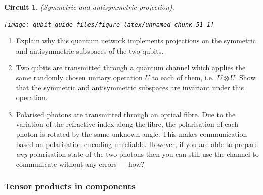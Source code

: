 \documentclass[fleqn,a4paper]{article}
\newtheorem*{circuit}{Circuit}
\theoremstyle{definition}
\theoremstyle{definition}
\theoremstyle{definition}
\theoremstyle{definition}
\theoremstyle{remark}
\begin{document}
\begin{circuit}

\emph{(Symmetric and antisymmetric projection).}

\begin{center}\texttt{[image: qubit\_guide\_files/figure-latex/unnamed-chunk-51-1]} \end{center}

\end{circuit}

\begin{enumerate}
\def\labelenumi{\arabic{enumi}.}
\setcounter{enumi}{3}
\item
  Explain why this quantum network implements projections on the symmetric and antisymmetric subspaces of the two qubits.
\item
  Two qubits are transmitted through a quantum channel which applies the same randomly chosen unitary operation \(U\) to each of them, i.e.~\(U\otimes U\).
  Show that the symmetric and antisymmetric subspaces are invariant under this operation.
\item
  Polarised photons are transmitted through an optical fibre.
  Due to the variation of the refractive index along the fibre, the polarisation of each photon is rotated by the same unknown angle.
  This makes communication based on polarisation encoding unreliable.
  However, if you are able to prepare \emph{any} polarisation state of the two photons then you can still use the channel to communicate without any errors --- how?
\end{enumerate}

\hypertarget{tensor-products-in-components}{%
\subsubsection{Tensor products in components}\label{tensor-products-in-components}}
\end{document}
